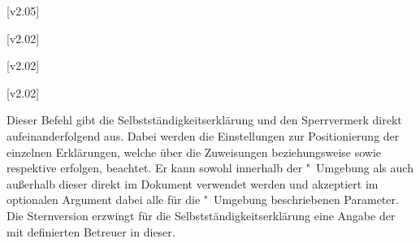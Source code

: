 \begin{DeclareEntity*}{}
\begin{DeclareEntity*}{}
\begin{DeclareEntity*}{}
\begin{Declaration}
  {}
\begin{Declaration}
  {}
  [v2.05]
\begin{Declaration}
  {}
\begin{Declaration}
  {}
  [v2.02]
\begin{Declaration}
  {}
  [v2.02]
\begin{Declaration}
  {}
  [v2.02]
\begin{Declaration}
  {}
\begin{Declaration}
  {}
\begin{Declaration}
  {}
\begin{Declaration}
  {}
\begin{Declaration}
  {}
\printdeclarationlist
%
Dieser Befehl gibt die Selbstständigkeitserklärung und den Sperrvermerk direkt 
aufeinanderfolgend aus. Dabei werden die Einstellungen zur Positionierung der 
einzelnen Erklärungen, welche über die Zuweisungen  
beziehungsweise  sowie  
respektive  erfolgen, beachtet. Er kann sowohl 
innerhalb der "~Umgebung als auch außerhalb dieser 
direkt im Dokument verwendet werden und akzeptiert im optionalen Argument dabei 
alle für die "~Umgebung beschriebenen Parameter. 
%
Die Sternversion erzwingt für die Selbstständigkeitserklärung eine Angabe der 
mit  definierten Betreuer in dieser.
\end{Declaration}
\end{Declaration}
\end{Declaration}
\end{Declaration}
\end{Declaration}
\end{Declaration}
\end{Declaration}
\end{Declaration}
\end{Declaration}
\end{Declaration}
\end{Declaration}


\end{DeclareEntity*}
\end{DeclareEntity*}
\end{DeclareEntity*}
